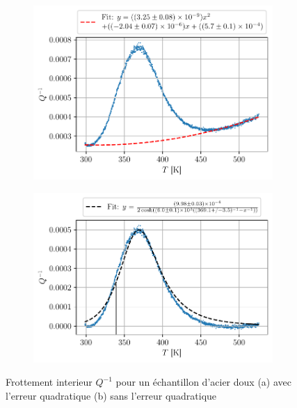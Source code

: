 \begin{figure}[h]
    \centering
    \begin{subfigure}{0.6\linewidth}
        \centering
        \includegraphics[width=\linewidth]{figures/acier_doux_q_1_temp_unadjusted.pdf}
        \caption{}
        \label{fig:acier_doux_temp_unadjusted}
    \end{subfigure}
    \begin{subfigure}{0.6\linewidth}
        \centering
        \includegraphics[width=\linewidth]{figures/acier_doux_q_1_temp_adjusted.pdf}
        \caption{}
        \label{fig:acier_doux_temp_adjusted}
    \end{subfigure}
    \caption{Frottement interieur \(Q^{-1}\) pour un échantillon d'acier doux (a) avec l'erreur quadratique (b) sans l'erreur quadratique}
\end{figure}


